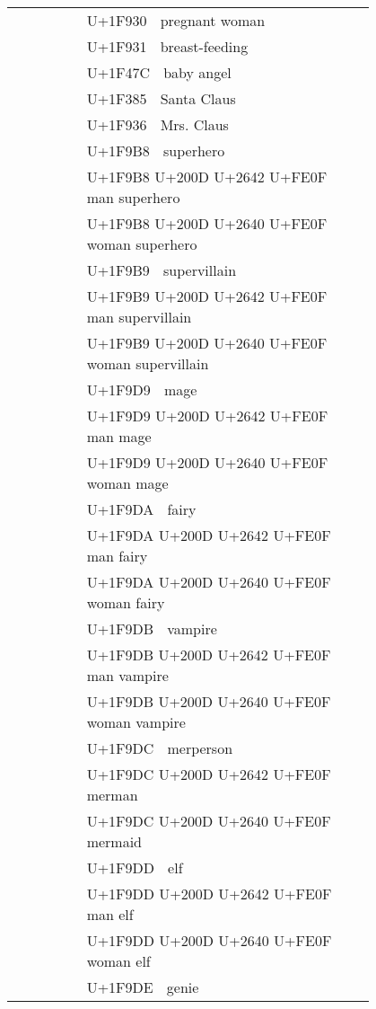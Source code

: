 \documentclass[a4paper,12pt]{article}
\newcommand{\fontA}[1]{{\fontspec[RawFeature={mode=harf,+dist,+ccmp}]{Segoe UI Emoji} #1}}
\newcommand{\fontB}[1]{{\fontspec[RawFeature={mode=harf,+dist,+ccmp}]{Noto Color Emoji} #1}}
\begin{document}
\begin{longtable}[c]{ccp{0.8\linewidth}}
\fontA{🤰}&\fontB{🤰}&U+1F930 🤰 pregnant woman\\
\fontA{🤱}&\fontB{🤱}&U+1F931 🤱 breast-feeding\\
\fontA{👼}&\fontB{👼}&U+1F47C 👼 baby angel\\
\fontA{🎅}&\fontB{🎅}&U+1F385 🎅 Santa Claus\\
\fontA{🤶}&\fontB{🤶}&U+1F936 🤶 Mrs. Claus\\
\fontA{🦸}&\fontB{🦸}&U+1F9B8 🦸 superhero\\
\fontA{🦸‍♂️}&\fontB{🦸‍♂️}&U+1F9B8 U+200D U+2642 U+FE0F 🦸‍♂️ man superhero\\
\fontA{🦸‍♀️}&\fontB{🦸‍♀️}&U+1F9B8 U+200D U+2640 U+FE0F 🦸‍♀️ woman superhero\\
\fontA{🦹}&\fontB{🦹}&U+1F9B9 🦹 supervillain\\
\fontA{🦹‍♂️}&\fontB{🦹‍♂️}&U+1F9B9 U+200D U+2642 U+FE0F 🦹‍♂️ man supervillain\\
\fontA{🦹‍♀️}&\fontB{🦹‍♀️}&U+1F9B9 U+200D U+2640 U+FE0F 🦹‍♀️ woman supervillain\\
\fontA{🧙}&\fontB{🧙}&U+1F9D9 🧙 mage\\
\fontA{🧙‍♂️}&\fontB{🧙‍♂️}&U+1F9D9 U+200D U+2642 U+FE0F 🧙‍♂️ man mage\\
\fontA{🧙‍♀️}&\fontB{🧙‍♀️}&U+1F9D9 U+200D U+2640 U+FE0F 🧙‍♀️ woman mage\\
\fontA{🧚}&\fontB{🧚}&U+1F9DA 🧚 fairy\\
\fontA{🧚‍♂️}&\fontB{🧚‍♂️}&U+1F9DA U+200D U+2642 U+FE0F 🧚‍♂️ man fairy\\
\fontA{🧚‍♀️}&\fontB{🧚‍♀️}&U+1F9DA U+200D U+2640 U+FE0F 🧚‍♀️ woman fairy\\
\fontA{🧛}&\fontB{🧛}&U+1F9DB 🧛 vampire\\
\fontA{🧛‍♂️}&\fontB{🧛‍♂️}&U+1F9DB U+200D U+2642 U+FE0F 🧛‍♂️ man vampire\\
\fontA{🧛‍♀️}&\fontB{🧛‍♀️}&U+1F9DB U+200D U+2640 U+FE0F 🧛‍♀️ woman vampire\\
\fontA{🧜}&\fontB{🧜}&U+1F9DC 🧜 merperson\\
\fontA{🧜‍♂️}&\fontB{🧜‍♂️}&U+1F9DC U+200D U+2642 U+FE0F 🧜‍♂️ merman\\
\fontA{🧜‍♀️}&\fontB{🧜‍♀️}&U+1F9DC U+200D U+2640 U+FE0F 🧜‍♀️ mermaid\\
\fontA{🧝}&\fontB{🧝}&U+1F9DD 🧝 elf\\
\fontA{🧝‍♂️}&\fontB{🧝‍♂️}&U+1F9DD U+200D U+2642 U+FE0F 🧝‍♂️ man elf\\
\fontA{🧝‍♀️}&\fontB{🧝‍♀️}&U+1F9DD U+200D U+2640 U+FE0F 🧝‍♀️ woman elf\\
\fontA{🧞}&\fontB{🧞}&U+1F9DE 🧞 genie\\

\end{longtable}
\end{document}
